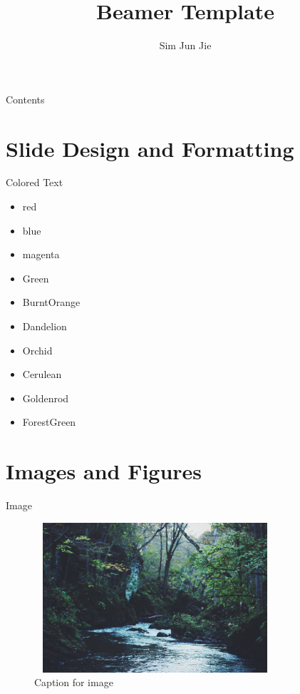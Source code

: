 \documentclass[hyperref={pdfpagemode=UseOutlines},xcolor=dvipsnames]{beamer}
\title{Beamer Template}
\author{Sim Jun Jie}
\begin{document}
\frame{\titlepage}

\begin{frame}[allowframebreaks]{Contents}
	\tableofcontents[hideallsubsections]
\end{frame}

\section{Slide Design and Formatting}
\begin{frame}{Colored Text}
	\begin{itemize}
		\item {\color{red} red}
		\item {\color{blue} blue}
		\item {\color{magenta} magenta}
		\item {\color{Green} Green}
		\item {\color{BurntOrange} BurntOrange}
		\item {\color{Dandelion} Dandelion}
		\item {\color{Orchid} Orchid}
		\item {\color{Cerulean} Cerulean}
		\item {\color{Goldenrod} Goldenrod}
		\item {\color{ForestGreen} ForestGreen}
	\end{itemize}
\end{frame}

\section{Images and Figures}
\begin{frame}{Image}
	\begin{figure}
		\begin{minipage}{\textwidth}
			\centering
			\includegraphics[width=0.8\textwidth,height=15em]{stream.jpg}
			\caption{Caption for image}
			\label{fig:sample_image}
		\end{minipage}
	\end{figure}
\end{frame}
\end{document}
